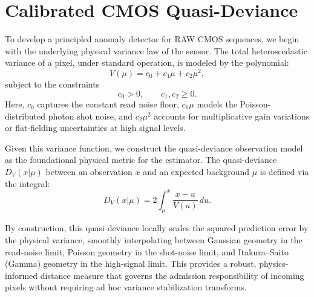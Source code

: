 \section{Calibrated CMOS Quasi-Deviance}
\label{sec:cmos_quasideviance}

To develop a principled anomaly detector for RAW CMOS sequences, we begin with the underlying physical variance law of the sensor. The total heteroscedastic variance of a pixel, under standard operation, is modeled by the polynomial:
\begin{equation}
V(\mu) = c_0 + c_1\mu + c_2\mu^2,
\end{equation}
subject to the constraints
\begin{equation}
c_0 > 0, \qquad c_1, c_2 \ge 0.
\end{equation}
Here, $c_0$ captures the constant read noise floor, $c_1\mu$ models the Poisson-distributed photon shot noise, and $c_2\mu^2$ accounts for multiplicative gain variations or flat-fielding uncertainties at high signal levels.

Given this variance function, we construct the quasi-deviance observation model as the foundational physical metric for the estimator. The quasi-deviance $D_V(x | \mu)$ between an observation $x$ and an expected background $\mu$ is defined via the integral:
\begin{equation}
D_V(x|\mu) = 2\int_\mu^x \frac{x-u}{V(u)}\,du.
\end{equation}

By construction, this quasi-deviance locally scales the squared prediction error by the physical variance, smoothly interpolating between Gaussian geometry in the read-noise limit, Poisson geometry in the shot-noise limit, and Itakura--Saito (Gamma) geometry in the high-signal limit. This provides a robust, physics-informed distance measure that governs the admission responsibility of incoming pixels without requiring ad hoc variance stabilization transforms.
